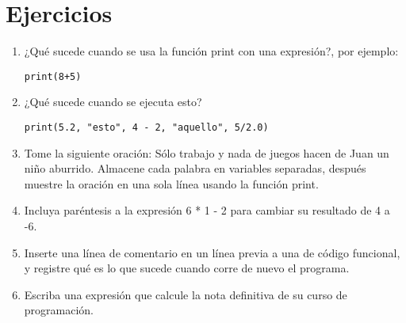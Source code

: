 \begin{description}
   
  
  
   
  
\end{description}

\section{Ejercicios}
\begin{enumerate}
\item ¿Qué sucede cuando se usa la función print con una expresión?, por
ejemplo: 
\begin{lstlisting}
print(8+5)
\end{lstlisting}
\item ¿Qué sucede cuando se ejecuta esto?
\begin{lstlisting}
print(5.2, "esto", 4 - 2, "aquello", 5/2.0)
\end{lstlisting}
\item Tome la siguiente oración: Sólo trabajo y nada de juegos hacen de
Juan un niño aburrido. Almacene cada palabra en variables separadas,
después muestre la oración en una sola línea usando la función print.
\item Incluya paréntesis a la expresión 6 {*} 1 - 2 para cambiar su resultado
de 4 a -6.
\item Inserte una línea de comentario en un línea previa a una de código
funcional, y registre qué es lo que sucede cuando corre de nuevo el
programa.
%
\item Escriba una expresión que calcule la nota definitiva de su curso de
programación.
\end{enumerate}

